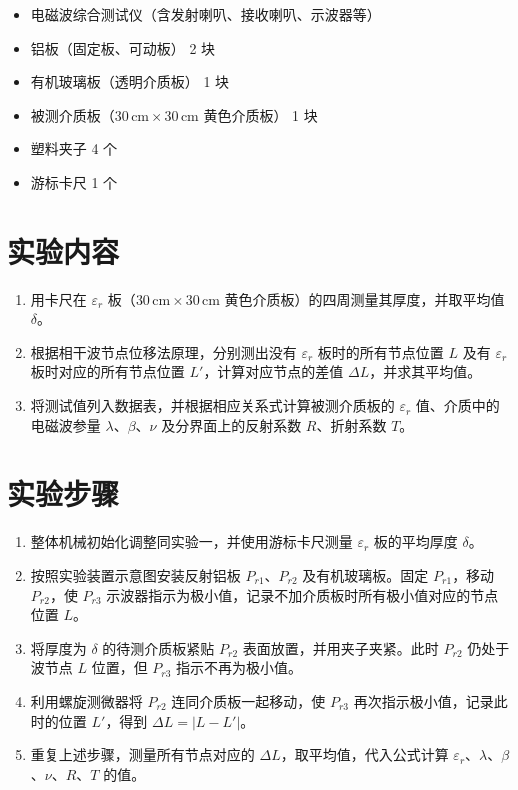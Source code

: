 \documentclass{../ElectromagneticFieldTemplate}
\begin{document}
\begin{itemize}
    \item 电磁波综合测试仪（含发射喇叭、接收喇叭、示波器等）
    \item 铝板（固定板、可动板） 2 块
    \item 有机玻璃板（透明介质板） 1 块
    \item 被测介质板（\(30\,\text{cm} \times 30\,\text{cm}\) 黄色介质板） 1 块
    \item 塑料夹子 4 个
    \item 游标卡尺 1 个
\end{itemize}

\section{实验内容}

\begin{enumerate}
    \item 用卡尺在 \(\varepsilon_r\) 板（\(30\,\text{cm} \times 30\,\text{cm}\) 黄色介质板）的四周测量其厚度，并取平均值 \(\delta\)。
    \item 根据相干波节点位移法原理，分别测出没有 \(\varepsilon_r\) 板时的所有节点位置 \(L\) 及有 \(\varepsilon_r\) 板时对应的所有节点位置 \(L'\)，计算对应节点的差值 \(\Delta L\)，并求其平均值。
    \item 将测试值列入数据表，并根据相应关系式计算被测介质板的 \(\varepsilon_r\) 值、介质中的电磁波参量 \(\lambda\)、\(\beta\)、\(\nu\) 及分界面上的反射系数 \(R\)、折射系数 \(T\)。
\end{enumerate}

\section{实验步骤}

\begin{enumerate}
    \item 整体机械初始化调整同实验一，并使用游标卡尺测量 \(\varepsilon_r\) 板的平均厚度 \(\delta\)。
    \item 按照实验装置示意图安装反射铝板 \(P_{r1}\)、\(P_{r2}\) 及有机玻璃板。固定 \(P_{r1}\)，移动 \(P_{r2}\)，使 \(P_{r3}\) 示波器指示为极小值，记录不加介质板时所有极小值对应的节点位置 \(L\)。
    \item 将厚度为 \(\delta\) 的待测介质板紧贴 \(P_{r2}\) 表面放置，并用夹子夹紧。此时 \(P_{r2}\) 仍处于波节点 \(L\) 位置，但 \(P_{r3}\) 指示不再为极小值。
    \item 利用螺旋测微器将 \(P_{r2}\) 连同介质板一起移动，使 \(P_{r3}\) 再次指示极小值，记录此时的位置 \(L'\)，得到 \(\Delta L = |L - L'|\)。
    \item 重复上述步骤，测量所有节点对应的 \(\Delta L\)，取平均值，代入公式计算 \(\varepsilon_r\)、\(\lambda\)、\(\beta\)、\(\nu\)、\(R\)、\(T\) 的值。
\end{enumerate}
\end{document}
